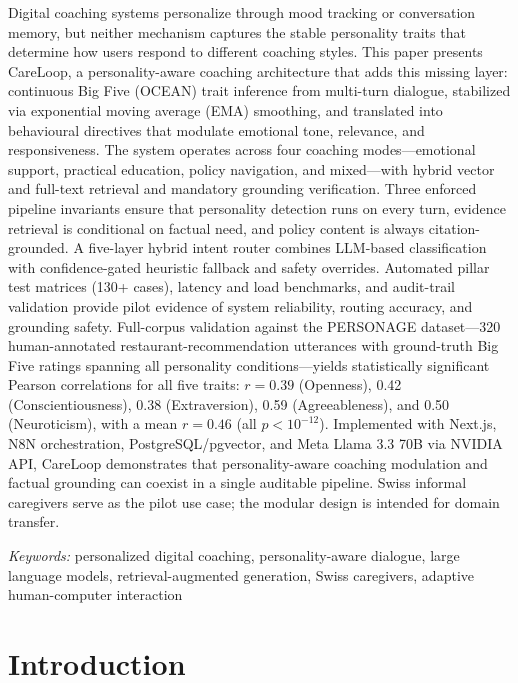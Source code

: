 \documentclass[10pt,a4paper]{report}
\newcommand{\keywords}[1]{\par\vspace{0.5em}\noindent\textit{Keywords:} #1}
\begin{document}
Digital coaching systems personalize through mood tracking or conversation memory, but neither mechanism captures the stable personality traits that determine how users respond to different coaching styles. This paper presents CareLoop, a personality-aware coaching architecture that adds this missing layer: continuous Big Five (OCEAN) trait inference from multi-turn dialogue, stabilized via exponential moving average (EMA) smoothing, and translated into behavioural directives that modulate emotional tone, relevance, and responsiveness. The system operates across four coaching modes---emotional support, practical education, policy navigation, and mixed---with hybrid vector and full-text retrieval and mandatory grounding verification. Three enforced pipeline invariants ensure that personality detection runs on every turn, evidence retrieval is conditional on factual need, and policy content is always citation-grounded. A five-layer hybrid intent router combines LLM-based classification with confidence-gated heuristic fallback and safety overrides. Automated pillar test matrices (130+ cases), latency and load benchmarks, and audit-trail validation provide pilot evidence of system reliability, routing accuracy, and grounding safety. Full-corpus validation against the PERSONAGE dataset---320 human-annotated restaurant-recommendation utterances with ground-truth Big Five ratings spanning all personality conditions---yields statistically significant Pearson correlations for all five traits: $r = 0.39$ (Openness), 0.42 (Conscientiousness), 0.38 (Extraversion), 0.59 (Agreeableness), and 0.50 (Neuroticism), with a mean $r = 0.46$ (all $p < 10^{-12}$). Implemented with Next.js, N8N orchestration, PostgreSQL/pgvector, and Meta Llama 3.3 70B via NVIDIA API, CareLoop demonstrates that personality-aware coaching modulation and factual grounding can coexist in a single auditable pipeline. Swiss informal caregivers serve as the pilot use case; the modular design is intended for domain transfer.

\keywords{personalized digital coaching, personality-aware dialogue, large language models, retrieval-augmented generation, Swiss caregivers, adaptive human-computer interaction}

\tableofcontents

\clearpage
\setcounter{page}{1}

\chapter{Introduction}
\label{ch:intro}
\end{document}
